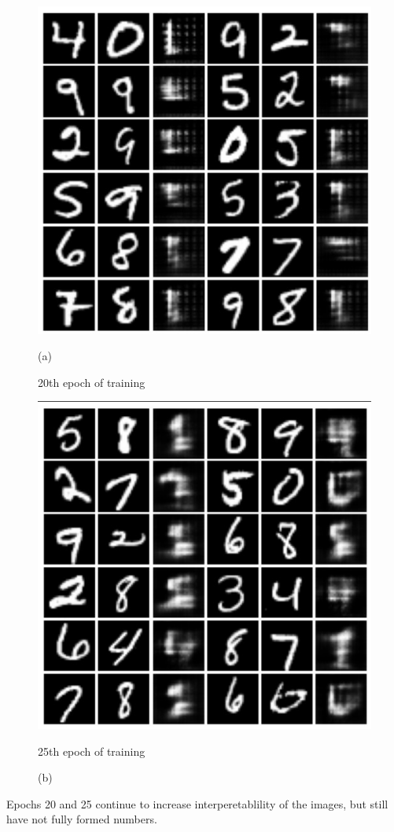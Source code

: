 \documentclass{article}
\begin{document}
\begin{figure}[hbt]
    \centering
    \begin{minipage}{.5\textwidth}
        \centering
        \includegraphics[width=.4\linewidth]{images/EXP7_19.jpg}
        \caption{(a)}{20th epoch of training}
        \label{fig:sub5}
    \end{minipage}%
    \begin{minipage}{.5\textwidth}
        \centering
        \includegraphics[width=.4\linewidth]{images/EXP7_24.jpg}
        \caption{(b)}{25th epoch of training}
        \label{fig:sub6}
    \end{minipage}
\end{figure}

Epochs 20 and 25 continue to increase interperetablility of the images, but still have not fully
formed numbers.
\end{document}
